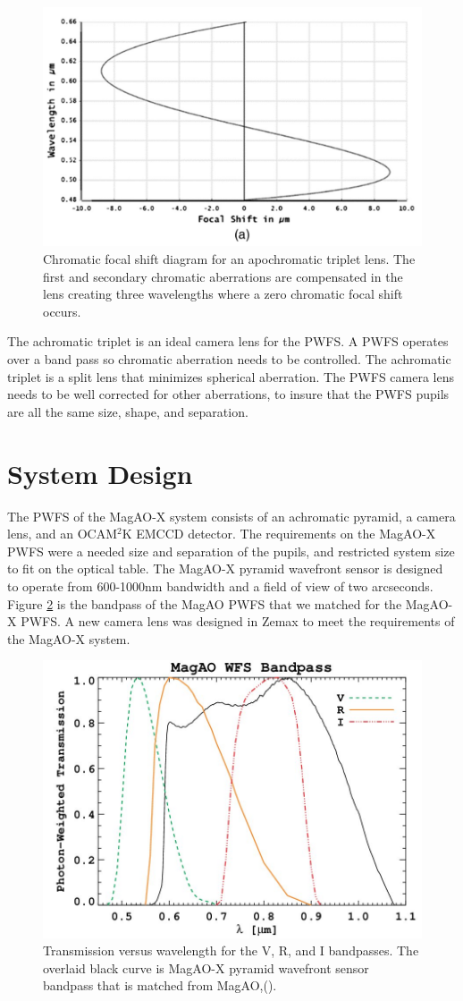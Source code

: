 \begin{figure}
    \centering
    \includegraphics[width=.6\textwidth]{Chapter Materials/Chapter Three Materials/tripleapochromat.PNG}
    \caption{Chromatic focal shift diagram for an apochromatic triplet lens. The first and secondary chromatic aberrations are compensated in the lens creating three wavelengths where a zero chromatic focal shift occurs.}
    \label{fig:apochromat}
\end{figure}

The achromatic triplet is an ideal camera lens for the PWFS. A PWFS operates over a band pass so chromatic aberration needs to be controlled. The achromatic triplet is a split lens that minimizes spherical aberration. The PWFS camera lens needs to be well corrected for other aberrations, to insure that the PWFS pupils are all the same size, shape, and separation. 



\section{System Design}

The PWFS of the MagAO-X system consists of an achromatic pyramid, a camera lens, and an OCAM$^2$K EMCCD detector. The requirements on the MagAO-X PWFS were a needed size and separation of the pupils, and restricted system size to fit on the optical table. The MagAO-X pyramid wavefront sensor is designed to operate from 600-1000nm bandwidth and a field of view of two arcseconds. Figure \ref{fig:bandpass} is the bandpass of the MagAO PWFS that we matched for the MagAO-X PWFS. A new camera lens was designed in Zemax to meet the requirements of the MagAO-X system. 
	
	
\begin{figure}[h]
	\centering
	\includegraphics[width=.5\textwidth]{Chapter Materials/Chapter Three Materials/MagAOBandpass_updated.jpg}
	\caption{Transmission versus wavelength for the V, R, and I bandpasses. The overlaid black curve is MagAO-X pyramid wavefront sensor bandpass that is matched from MagAO,(\citep{morzinski2014magao}).}
	\label{fig:bandpass}
\end{figure}
	
